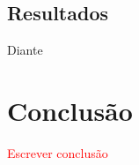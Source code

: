 \documentclass[conference]{IEEEtran}
\begin{document}
\subsection{Resultados}

Diante 

\section{Conclusão}
\label{sec:conclusao}

\textcolor{red}{Escrever conclusão}




% 

\end{document}
